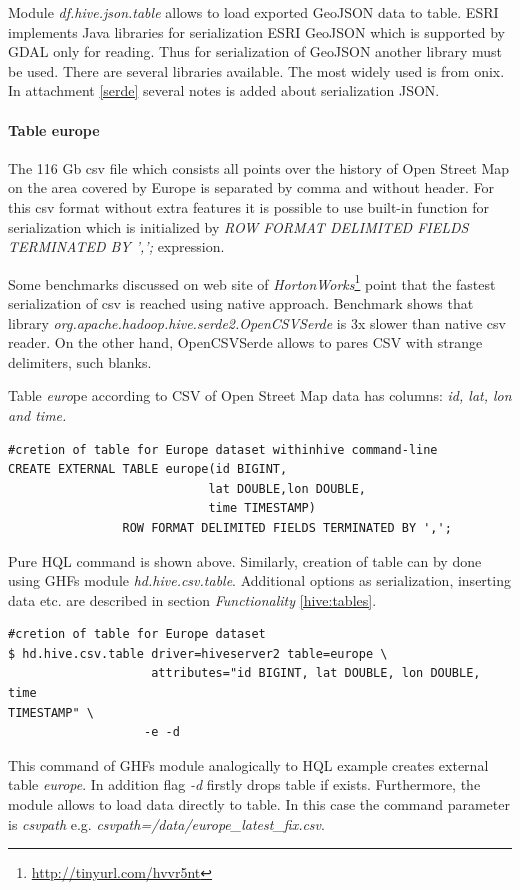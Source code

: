 \documentclass[a4paper,12pt,oneside]{report}
\begin{document}
	
		Module \textit{df.hive.json.table} allows to load exported GeoJSON data to
	table. ESRI implements Java libraries for serialization ESRI GeoJSON which is
	supported by GDAL only for reading. Thus for serialization of GeoJSON another library must be
	used. There are several libraries available. The most widely used is
	from onix. In attachment \ref{serde} several notes is added about serialization
	JSON.

\paragraph{Table europe}
		The 116 Gb csv file which consists all points over the history of Open Street
	Map on the area covered by Europe is separated by comma and without header. For this csv
	format without extra features it is possible to use built-in function for
	serialization which is initialized by \textit{ROW FORMAT DELIMITED FIELDS
	TERMINATED BY ',';} expression.
		
	Some benchmarks discussed on web site of
	\textit{HortonWorks}\footnote{\url{http://tinyurl.com/hvvr5nt}} point that the fastest serialization of csv is reached using native approach. Benchmark shows
	that library \textit{org.apache.hadoop.hive.serde2.OpenCSVSerde} is 3x slower
	than native csv reader. On the other hand, OpenCSVSerde allows to pares CSV with
	strange delimiters, such blanks.
		
		
	Table \textit{euro}pe according to CSV of Open Street Map data has columns: \textit{id, lat, lon
and time.}
\begin{footnotesize}
	\begin{lstlisting}[style=python]
#cretion of table for Europe dataset withinhive command-line
CREATE EXTERNAL TABLE europe(id BIGINT,
                            lat DOUBLE,lon DOUBLE,
                            time TIMESTAMP)
			    ROW FORMAT DELIMITED FIELDS TERMINATED BY ',';
		\end{lstlisting}
	\end{footnotesize}
	Pure HQL command is shown above. Similarly, creation of table can by done using GHFs
	module \textit{hd.hive.csv.table}. Additional options as serialization,
	inserting data etc. are described in section
	\textit{Functionality} \ref{hive:tables}. 
\begin{footnotesize}
	\begin{lstlisting}[style=python]
#cretion of table for Europe dataset
$ hd.hive.csv.table driver=hiveserver2 table=europe \
                    attributes="id BIGINT, lat DOUBLE, lon DOUBLE, time
TIMESTAMP" \
                   -e -d
		\end{lstlisting}
	\end{footnotesize}
	This command of GHFs module analogically to HQL example creates external table
	\textit{europe}. In addition flag \textit{-d} firstly drops table if exists.
	Furthermore, the module allows to load data directly to table. In this case the
	command parameter is \textit{csvpath} e.g.
	\textit{csvpath=/data/europe\_latest\_fix.csv}.
	
\end{document}
